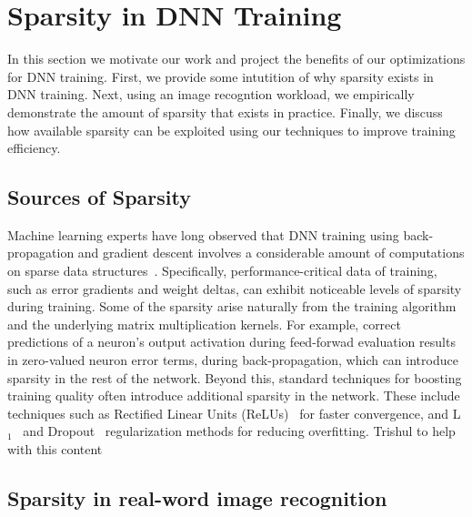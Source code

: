 \section{Sparsity in DNN Training}
 \label{sec:sparse_dnn_training}
 
 In this section we motivate our work and project the benefits of our optimizations for DNN training.  First, we provide some intutition of why sparsity exists in DNN training.  Next, using an image recogntion workload, we empirically demonstrate the amount of sparsity that exists in practice.  Finally, we discuss how available sparsity can be exploited using our techniques to improve training efficiency. 
 
\subsection{Sources of Sparsity}
\label{subsec:sparsity_source}

Machine learning experts have long observed that DNN training using back-propagation and gradient descent involves a considerable amount of computations on sparse data structures~\cite{Ng04, Nair10, Krizhevsky12, Bengio13, Srivastava14a}.  Specifically, performance-critical data of training, such as error gradients and weight deltas, can exhibit noticeable levels of sparsity during training.   Some of the sparsity arise naturally from the training algorithm  and the underlying matrix multiplication kernels.  For example, correct predictions of a neuron's output activation during feed-forwad evaluation results in zero-valued neuron error terms, during back-propagation, which can introduce sparsity in the rest of the network.  Beyond this, standard techniques for boosting training quality often introduce additional sparsity in the network.  These include techniques such as Rectified Linear Units (ReLUs)~\cite{Nair10, Krizhevsky12} for faster convergence, and  L$_1$~\cite{Ng04, Bengio13} and Dropout~\cite{Srivastava14a} regularization methods for reducing overfitting.  {\color{red} Trishul to help with this content}
 
\subsection{Sparsity in real-word image recognition}
\label{subsec:sparsity_profile}


